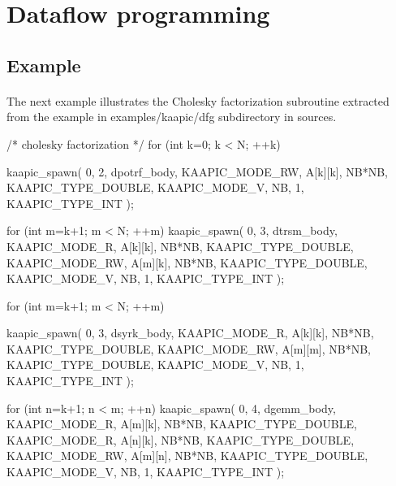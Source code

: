 \documentclass[a4paper, 11pt]{article}
\makeatletter
\newenvironment{apisection}[2][noshortnameprovided]{%
  \newpage
  \section{#2}
  \label{api@#1}
  \newcommand{\api@newpart}[4][noshortpartnameprovided]{%
    \newenvironment{##1}{%
      \subsection{##2}%
      \label{api@#1@##1}%
      ##3%
    }{##4}%
  }%
  \api@newpart[synopsis]{Synopsis}{}{}%
  \api@newpart[call]{Call}{}{}%
  \api@newpart[desc]{Description}{}{}%
  \api@newpart[params]{Parameters}{%
    \let\api@indesc\@empty
    \newcommand{\param}[1]{%
      \def\api@indesc{yes}%
      \begin{description}%
        \renewcommand{\param}[1]{\item[########1]}%
      \item[####1]
      }%
      \newenvironment{parameters}{%
        \begin{description}%
          \renewcommand{\param}[1]{\item[########1]}%
        }{%
        \end{description}%
      }
    }{%
      \ifx\api@indesc\@empty\relax\else%
    \end{description}%
    \fi%
  }%
  \api@newpart[ret]{Return value}{%
    \newcommand{\otherret}{\par\medskip\noindent}%
  }{}%
  \api@newpart[example]{Example}{}{}%
}{}
\makeatother
\begin{document}
\begin{apisection}[dataflow]{Dataflow programming}
  \begin{example}\label{cholesky}
    \paragraph{}
    The next example illustrates the Cholesky factorization subroutine extracted from the example in examples/kaapic/dfg subdirectory in sources.\\
  \begin{code}
    /* cholesky factorization */
    for (int k=0; k < N; ++k)
    {
      kaapic_spawn( 0, 2, dpotrf_body, 
      	KAAPIC_MODE_RW, A[k][k], NB*NB, KAAPIC_TYPE_DOUBLE,
	KAAPIC_MODE_V, NB, 1, KAAPIC_TYPE_INT
      );

      for (int m=k+1; m < N; ++m)
        kaapic_spawn( 0, 3, dtrsm_body, 
          KAAPIC_MODE_R,  A[k][k], NB*NB, KAAPIC_TYPE_DOUBLE,
          KAAPIC_MODE_RW, A[m][k], NB*NB, KAAPIC_TYPE_DOUBLE,
          KAAPIC_MODE_V, NB, 1, KAAPIC_TYPE_INT
        );

      for (int m=k+1; m < N; ++m)
      {
        kaapic_spawn( 0, 3, dsyrk_body,
          KAAPIC_MODE_R,  A[k][k], NB*NB, KAAPIC_TYPE_DOUBLE,
          KAAPIC_MODE_RW, A[m][m], NB*NB, KAAPIC_TYPE_DOUBLE, 
          KAAPIC_MODE_V, NB, 1, KAAPIC_TYPE_INT
        );

        for (int n=k+1; n < m; ++n)
        {
          kaapic_spawn( 0, 4, dgemm_body,
            KAAPIC_MODE_R,  A[m][k], NB*NB, KAAPIC_TYPE_DOUBLE,
            KAAPIC_MODE_R, A[n][k], NB*NB, KAAPIC_TYPE_DOUBLE, 
            KAAPIC_MODE_RW, A[m][n], NB*NB, KAAPIC_TYPE_DOUBLE, 
            KAAPIC_MODE_V, NB, 1, KAAPIC_TYPE_INT
          );
        }
      }
    }
  \end{code}
  \end{example}
\end{apisection}
\end{document}
